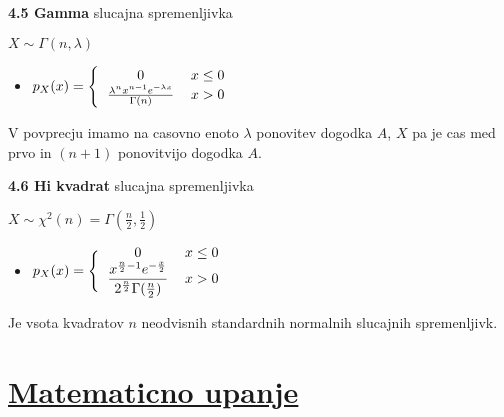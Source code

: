 \documentclass{article}
\begin{document}
\begin{multicols}{2}
	\textbf{4.5 Gamma} slucajna spremenljivka
	\begin{center}
		\begin{math}
			X \sim \Gamma(n, \lambda)
		\end{math}
	\end{center}

	\begin{itemize}
		\item  \begin{math}
			      p_{X}(x) =
			      \Bigg\{\begin{tabular}{ccc}
				      $0$                                                       & $x \leq 0$ & \\
				      $\frac{\lambda^{n} x^{n- 1} e^{ - \lambda x}}{\Gamma(n)}$ & $x > 0$    & \\
			      \end{tabular}
		      \end{math}
	\end{itemize}

	V povprecju imamo na casovno enoto $\lambda$ ponovitev dogodka $A$, $X$ pa je cas med
	prvo in $(n + 1)$ ponovitvijo dogodka $A$.

	\textbf{4.6 Hi kvadrat} slucajna spremenljivka
	\begin{center}
		\begin{math}
			X \sim \chi^{2}(n) = \Gamma(\frac{n}{2}, \frac{1}{2})
		\end{math}
	\end{center}

	\begin{itemize}
		\item  \begin{math}
			      p_{X}(x) =
			      \Bigg\{\begin{tabular}{ccc}
				      $0$                                                                                   & $x \leq 0$ & \\
				      $\dfrac{x^{\frac{n}{2} - 1} e ^{- \frac{x}{2}}}{2^{\frac{n}{2}} \Gamma(\frac{n}{2})}$ & $x > 0$    & \\
			      \end{tabular}
		      \end{math}
	\end{itemize}

	Je vsota kvadratov $n$ neodvisnih standardnih normalnih slucajnih spremenljivk.

	\section{\underline{Matematicno upanje}}


\end{multicols}
\end{document}
